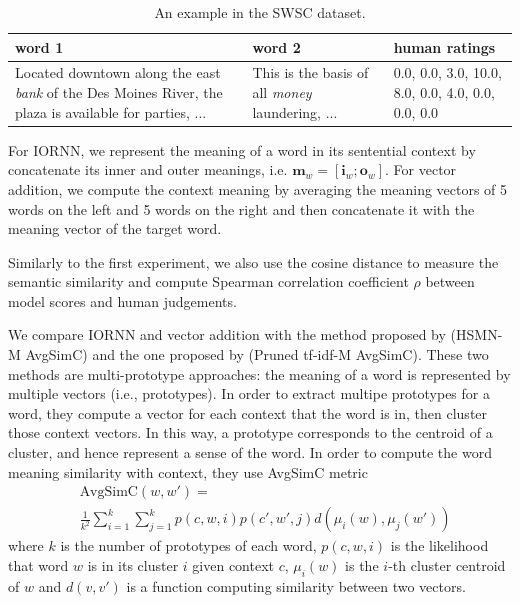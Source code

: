 \documentclass[11pt]{article}
\begin{document}
\begin{table}[!ht]
	\center
	\begin{tabular}{|p{6cm}|p{6cm}|p{3cm}|}
		\hline
		word 1 & word 2 & human ratings \\ \hline \hline
		
		 Located downtown along the east \textit{bank} of the Des Moines River, the plaza is available for parties, ... & This is the basis of all \textit{ money} laundering, ... &  0.0, 0.0, 3.0, 10.0, 8.0, 0.0, 4.0, 0.0, 0.0, 0.0 \\ \hline
	\end{tabular}
	\caption{An example in the SWSC dataset.}
	\label{table swsc}
\end{table}

For IORNN, we represent the meaning of a word in its sentential context by concatenate its inner 
and outer meanings, i.e. $\mathbf{m}_w = [\mathbf{i}_w;\mathbf{o}_w]$. 
For vector addition, we compute the context meaning by averaging the meaning vectors of 5 words
on the left and 5 words on the right and then concatenate it with the meaning vector of the target 
word.

Similarly to the first experiment, we also use the cosine distance to measure the semantic similarity
and compute Spearman correlation coefficient $\rho$ between model scores and human judgements.

We compare IORNN and vector addition with the method proposed by \cite{huang2012improving}
(HSMN-M AvgSimC) and the one proposed by \cite{reisinger2010multi} (Pruned tf-idf-M AvgSimC).
These two methods are multi-prototype approaches: the meaning of a word is represented 
by multiple vectors (i.e., prototypes). In order to extract multipe prototypes for a word, they compute 
a vector for each context that the word is in, then cluster those context vectors. In this way, a prototype
corresponds to the centroid of a cluster, and hence represent a sense of the word. 
In order to compute the word meaning similarity with context, they use AvgSimC metric 
\begin{align*}
	&\text{AvgSimC}(w,w') = \\
	&\frac{1}{k^2} \sum_{i=1}^k \sum_{j=1}^k p(c,w,i)p(c',w',j)d(\mu_i(w),\mu_j(w'))
\end{align*}
where $k$ is the number of prototypes of each word, $p(c,w,i)$ is the likelihood that word $w$ is in 
its cluster $i$ given context $c$, $\mu_i(w)$ is the $i$-th cluster centroid of $w$ and $d(v,v')$ is a function 
computing similarity between two vectors.
\end{document}
